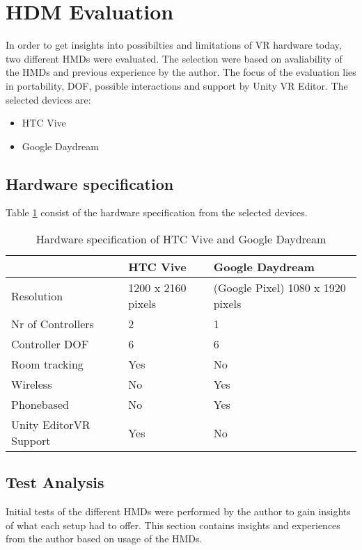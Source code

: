 \section{HDM Evaluation}
\label{result:hardware}
In order to get insights into possibilties and limitations of VR hardware today, two different HMDs were evaluated. The selection were based on avaliability of the HMDs and previous experience by the author. The focus of the evaluation lies in portability, DOF, possible interactions and support by Unity VR Editor. The selected devices are:
\begin{itemize}
  \item HTC Vive
  \item Google Daydream
\end{itemize}
\subsection{Hardware specification}
Table \ref{table:result:hardware:spec} consist of the hardware specification from the selected devices.
\begin{table}[]
\centering
\caption{Hardware specification of HTC Vive and Google Daydream}
\label{table:result:hardware:spec}
\begin{tabular}{|l|l|l|}
  \hline
                       & \textbf{HTC Vive}  & \textbf{Google Daydream}          \\\hline
Resolution             & 1200 x 2160 pixels & (Google Pixel) 1080 x 1920 pixels \\\hline
Nr of Controllers      & 2                  & 1                                 \\\hline
Controller DOF         & 6                  & 6                                 \\\hline
Room tracking          & Yes                & No                                \\\hline
Wireless               & No                 & Yes                               \\\hline
Phonebased             & No                 & Yes                               \\\hline
Unity EditorVR Support & Yes                & No                                \\\hline
\end{tabular}
\end{table}
\subsection{Test Analysis}
Initial tests of the different HMDs were performed by the author to gain insights of what each setup had to offer. This section contains insights and experiences from the author based on usage of the HMDs.
